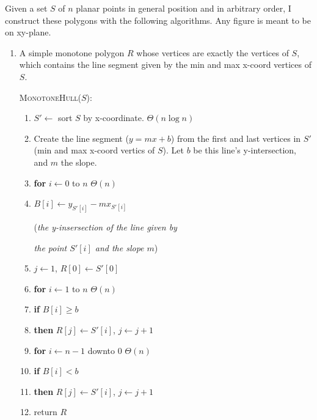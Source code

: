 \documentclass [12pt]{article}
\begin{document}
    Given a set $S$ of $n$ planar points in general position and in arbitrary order, I construct these polygons with the following algorithms. Any figure is meant to be on xy-plane.

    \begin{enumerate}[label=(\alph*)]
        \item A simple monotone polygon $R$ whose vertices are exactly the vertices of $S$, which contains the line segment given by the min and max x-coord vertices of $S$. 

            \cbstart
            \textsc{MonotoneHull($S$)}:
            \begin{enumerate}[label=\arabic*.]
                \item $S' \leftarrow$ sort $S$ by x-coordinate. $\Theta(n\log n)$
                \item Create the line segment ($y = mx + b$) from the first and last vertices in $S'$ (min and max x-coord vertics of $S$). Let $b$ be this line's y-intersection, and $m$ the slope.
                \item \textbf{for} $i \leftarrow 0$ to $n$ \hspace{1cm}$\Theta(n)$
                \item \hspace{1cm} $B[i] \leftarrow y_{S'[i]} - m x_{S'[i]}$ 
                 
                    \hspace{1cm} (\emph{the y-insersection of the line given by} 
                
                    \hspace{1cm} \emph{the point $S'[i]$ and the slope $m$})
                \item $j \leftarrow 1$, $R[0] \leftarrow S'[0]$
                \item \textbf{for} $i \leftarrow 1$ to $n$ \hspace{1cm}$\Theta(n)$
                \item \hspace{1cm} \textbf{if} $B[i] \geq b$ 
                \item \hspace{1.5cm} \textbf{then} $R[j] \leftarrow S'[i]$, $j\leftarrow j + 1$
                \item \textbf{for} $i \leftarrow n - 1$ downto $0$ \hspace{1cm}$\Theta(n)$
                \item \hspace{1cm} \textbf{if} $B[i] < b$ 
                \item \hspace{1.5cm} \textbf{then} $R[j] \leftarrow S'[i]$, $j\leftarrow j + 1$
                \item return $R$
            \end{enumerate}
        \cbend


\end{enumerate}
\end{document}
